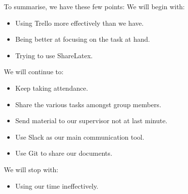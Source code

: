 To summarise, we have these few points:
We will begin with:
\begin{itemize}
\item Using Trello more effectively than we have.
\item Being better at focusing on the task at hand.
\item Trying to use ShareLatex.
\end{itemize}

We will continue to:
\begin{itemize}
\item Keep taking attendance.
\item Share the various tasks amongst group members.
\item Send material to our supervisor not at last minute.
\item Use Slack as our main communication tool.
\item Use Git to share our documents.
\end{itemize}

We will stop with:
\begin{itemize}
\item Using our time ineffectively.
\end{itemize}


